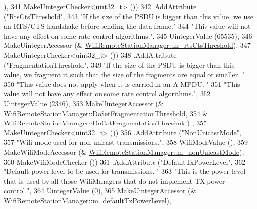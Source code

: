 \begin{DoxyCode}
      ),
341                    MakeUintegerChecker<uint32\_t> ())
342     .AddAttribute (\textcolor{stringliteral}{"RtsCtsThreshold"},
343                    \textcolor{stringliteral}{"If the size of the PSDU is bigger than this value, we use an RTS/CTS handshake before
       sending the data frame."}
344                    \textcolor{stringliteral}{"This value will not have any effect on some rate control algorithms."},
345                    UintegerValue (65535),
346                    MakeUintegerAccessor (&
      \hyperlink{classns3_1_1WifiRemoteStationManager_af47323c64e4f6bb392fdd0c84764b26f}{WifiRemoteStationManager::m\_rtsCtsThreshold}),
347                    MakeUintegerChecker<uint32\_t> ())
348     .AddAttribute (\textcolor{stringliteral}{"FragmentationThreshold"},
349                    \textcolor{stringliteral}{"If the size of the PSDU is bigger than this value, we fragment it such that the size of
       the fragments are equal or smaller. "}
350                    \textcolor{stringliteral}{"This value does not apply when it is carried in an A-MPDU. "}
351                    \textcolor{stringliteral}{"This value will not have any effect on some rate control algorithms."},
352                    UintegerValue (2346),
353                    MakeUintegerAccessor (&
      \hyperlink{classns3_1_1WifiRemoteStationManager_a2ec6b0ce2ce5df839bfc7f2a2895a6f2}{WifiRemoteStationManager::DoSetFragmentationThreshold},
354                                          &
      \hyperlink{classns3_1_1WifiRemoteStationManager_adc62f6f62cbcd9b67913eeb775d3e554}{WifiRemoteStationManager::DoGetFragmentationThreshold})
      ,
355                    MakeUintegerChecker<uint32\_t> ())
356     .AddAttribute (\textcolor{stringliteral}{"NonUnicastMode"},
357                    \textcolor{stringliteral}{"Wifi mode used for non-unicast transmissions."},
358                    WifiModeValue (),
359                    MakeWifiModeAccessor (&
      \hyperlink{classns3_1_1WifiRemoteStationManager_a713c2f64bf56c10372adef12988a2acf}{WifiRemoteStationManager::m\_nonUnicastMode}),
360                    MakeWifiModeChecker ())
361     .AddAttribute (\textcolor{stringliteral}{"DefaultTxPowerLevel"},
362                    \textcolor{stringliteral}{"Default power level to be used for transmissions. "}
363                    \textcolor{stringliteral}{"This is the power level that is used by all those WifiManagers that do not implement TX
       power control."},
364                    UintegerValue (0),
365                    MakeUintegerAccessor (&
      \hyperlink{classns3_1_1WifiRemoteStationManager_a6b41fa7af49c732cae53453284c9070f}{WifiRemoteStationManager::m\_defaultTxPowerLevel}),

\end{DoxyCode}
